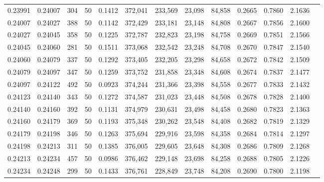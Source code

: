 \begin{tabular}{rrrrrrrrrrrrr}
0.23991 & 0.24007 &   304 &  50 &                                     0.1412 & 372,041 & 233,569 &  23,098 &  84,858 & 0.2665 & 0.7860 & 2.1636 \\
0.24007 & 0.24027 &   388 &  50 &                                     0.1142 & 372,429 & 233,181 &  23,148 &  84,808 & 0.2667 & 0.7856 & 2.1600 \\
0.24027 & 0.24045 &   358 &  50 &                                     0.1225 & 372,787 & 232,823 &  23,198 &  84,758 & 0.2669 & 0.7851 & 2.1566 \\
0.24045 & 0.24060 &   281 &  50 &                                     0.1511 & 373,068 & 232,542 &  23,248 &  84,708 & 0.2670 & 0.7847 & 2.1540 \\
0.24060 & 0.24079 &   337 &  50 &                                     0.1292 & 373,405 & 232,205 &  23,298 &  84,658 & 0.2672 & 0.7842 & 2.1509 \\
0.24079 & 0.24097 &   347 &  50 &                                     0.1259 & 373,752 & 231,858 &  23,348 &  84,608 & 0.2674 & 0.7837 & 2.1477 \\
0.24097 & 0.24122 &   492 &  50 &                                     0.0923 & 374,244 & 231,366 &  23,398 &  84,558 & 0.2677 & 0.7833 & 2.1432 \\
0.24123 & 0.24140 &   343 &  50 &                                     0.1272 & 374,587 & 231,023 &  23,448 &  84,508 & 0.2678 & 0.7828 & 2.1400 \\
0.24140 & 0.24160 &   392 &  50 &                                     0.1131 & 374,979 & 230,631 &  23,498 &  84,458 & 0.2680 & 0.7823 & 2.1363 \\
0.24160 & 0.24179 &   369 &  50 &                                     0.1193 & 375,348 & 230,262 &  23,548 &  84,408 & 0.2682 & 0.7819 & 2.1329 \\
0.24179 & 0.24198 &   346 &  50 &                                     0.1263 & 375,694 & 229,916 &  23,598 &  84,358 & 0.2684 & 0.7814 & 2.1297 \\
0.24198 & 0.24213 &   311 &  50 &                                     0.1385 & 376,005 & 229,605 &  23,648 &  84,308 & 0.2686 & 0.7809 & 2.1268 \\
0.24213 & 0.24234 &   457 &  50 &                                     0.0986 & 376,462 & 229,148 &  23,698 &  84,258 & 0.2688 & 0.7805 & 2.1226 \\
0.24234 & 0.24248 &   299 &  50 &                                     0.1433 & 376,761 & 228,849 &  23,748 &  84,208 & 0.2690 & 0.7800 & 2.1198 \\

\end{tabular}
